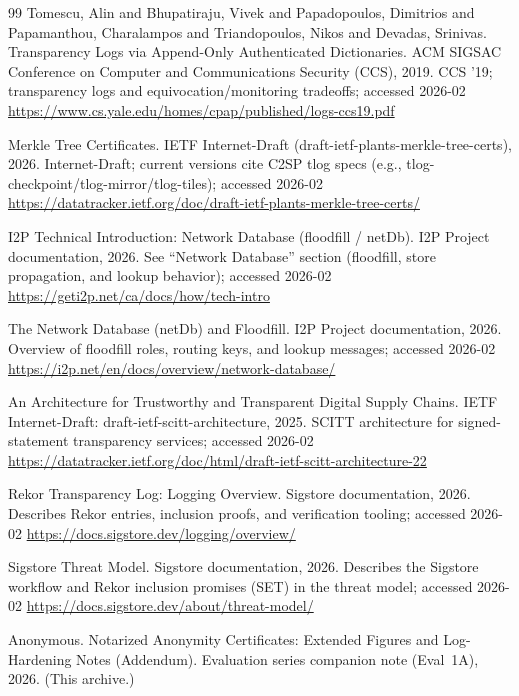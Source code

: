 \documentclass[11pt]{article}
\begin{document}
\begin{thebibliography}{99}
Tomescu, Alin and Bhupatiraju, Vivek and Papadopoulos, Dimitrios and Papamanthou, Charalampos and Triandopoulos, Nikos and Devadas, Srinivas.
\newblock Transparency Logs via Append-Only Authenticated Dictionaries.
\newblock ACM SIGSAC Conference on Computer and Communications Security (CCS), 2019.
\newblock CCS '19; transparency logs and equivocation/monitoring tradeoffs; accessed 2026-02
\newblock \url{https://www.cs.yale.edu/homes/cpap/published/logs-ccs19.pdf}

\newblock Merkle Tree Certificates.
\newblock IETF Internet-Draft (draft-ietf-plants-merkle-tree-certs), 2026.
\newblock Internet-Draft; current versions cite C2SP tlog specs (e.g., tlog-checkpoint/tlog-mirror/tlog-tiles); accessed 2026-02
\newblock \url{https://datatracker.ietf.org/doc/draft-ietf-plants-merkle-tree-certs/}

\newblock I2P Technical Introduction: Network Database (floodfill / netDb).
\newblock I2P Project documentation, 2026.
\newblock See ``Network Database'' section (floodfill, store propagation, and lookup behavior); accessed 2026-02
\newblock \url{https://geti2p.net/ca/docs/how/tech-intro}

\newblock The Network Database (netDb) and Floodfill.
\newblock I2P Project documentation, 2026.
\newblock Overview of floodfill roles, routing keys, and lookup messages; accessed 2026-02
\newblock \url{https://i2p.net/en/docs/overview/network-database/}

\newblock An Architecture for Trustworthy and Transparent Digital Supply Chains.
\newblock IETF Internet-Draft: draft-ietf-scitt-architecture, 2025.
\newblock SCITT architecture for signed-statement transparency services; accessed 2026-02
\newblock \url{https://datatracker.ietf.org/doc/html/draft-ietf-scitt-architecture-22}

\newblock Rekor Transparency Log: Logging Overview.
\newblock Sigstore documentation, 2026.
\newblock Describes Rekor entries, inclusion proofs, and verification tooling; accessed 2026-02
\newblock \url{https://docs.sigstore.dev/logging/overview/}

\newblock Sigstore Threat Model.
\newblock Sigstore documentation, 2026.
\newblock Describes the Sigstore workflow and Rekor inclusion promises (SET) in the threat model; accessed 2026-02
\newblock \url{https://docs.sigstore.dev/about/threat-model/}

Anonymous.
\newblock Notarized Anonymity Certificates: Extended Figures and Log-Hardening Notes (Addendum).
\newblock Evaluation series companion note (Eval~1A), 2026. (This archive.)

\end{thebibliography}
\end{document}
